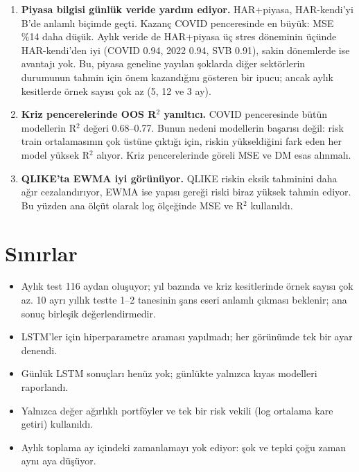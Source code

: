 \documentclass[11pt,a4paper]{article}
\newcommand{\Rsq}{R$^2$}
\begin{document}
\begin{enumerate}[resume]
  \item \textbf{Piyasa bilgisi günlük veride yardım ediyor.} HAR+piyasa, HAR-kendi'yi B'de anlamlı biçimde geçti.
        Kazanç COVID penceresinde en büyük: MSE \%14 daha düşük. Aylık veride de HAR+piyasa üç stres döneminin üçünde
        HAR-kendi'den iyi (COVID 0.94, 2022 0.94, SVB 0.91), sakin dönemlerde ise avantajı yok. Bu, piyasa geneline yayılan
        şoklarda diğer sektörlerin durumunun tahmin için önem kazandığını gösteren bir ipucu; ancak aylık kesitlerde
        örnek sayısı çok az (5, 12 ve 3 ay).
  \item \textbf{Kriz pencerelerinde OOS \Rsq{} yanıltıcı.} COVID penceresinde bütün modellerin \Rsq{} değeri 0.68--0.77.
        Bunun nedeni modellerin başarısı değil: risk train ortalamasının çok üstüne çıktığı için, riskin yükseldiğini fark eden
        her model yüksek \Rsq{} alıyor. Kriz pencerelerinde göreli MSE ve DM esas alınmalı.
  \item \textbf{QLIKE'ta EWMA iyi görünüyor.} QLIKE riskin eksik tahminini daha ağır cezalandırıyor, EWMA ise yapısı gereği riski
        biraz yüksek tahmin ediyor. Bu yüzden ana ölçüt olarak log ölçeğinde MSE ve \Rsq{} kullanıldı.
\end{enumerate}

\section{Sınırlar}
\begin{itemize}
  \item Aylık test 116 aydan oluşuyor; yıl bazında ve kriz kesitlerinde örnek sayısı çok az. 10 ayrı yıllık testte
        1--2 tanesinin şans eseri anlamlı çıkması beklenir; ana sonuç birleşik değerlendirmedir.
  \item LSTM'ler için hiperparametre araması yapılmadı; her görünümde tek bir ayar denendi.
  \item Günlük LSTM sonuçları henüz yok; günlükte yalnızca kıyas modelleri raporlandı.
  \item Yalnızca değer ağırlıklı portföyler ve tek bir risk vekili (log ortalama kare getiri) kullanıldı.
  \item Aylık toplama ay içindeki zamanlamayı yok ediyor: şok ve tepki çoğu zaman aynı aya düşüyor.
\end{itemize}

\end{document}
